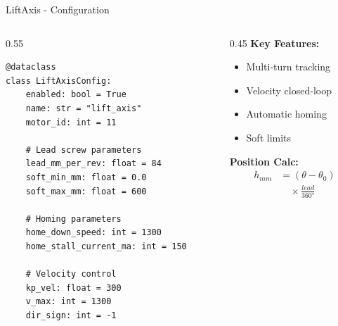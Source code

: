 \begin{frame}[fragile]{LiftAxis - Configuration}
\begin{columns}
\begin{column}{0.55\textwidth}
\begin{lstlisting}[basicstyle=\ttfamily\scriptsize]
@dataclass
class LiftAxisConfig:
    enabled: bool = True
    name: str = "lift_axis"
    motor_id: int = 11

    # Lead screw parameters
    lead_mm_per_rev: float = 84
    soft_min_mm: float = 0.0
    soft_max_mm: float = 600

    # Homing parameters
    home_down_speed: int = 1300
    home_stall_current_ma: int = 150

    # Velocity control
    kp_vel: float = 300
    v_max: int = 1300
    dir_sign: int = -1
\end{lstlisting}
\end{column}
\begin{column}{0.45\textwidth}
    \textbf{Key Features:}
    \begin{itemize}
        \item Multi-turn tracking
        \item Velocity closed-loop
        \item Automatic homing
        \item Soft limits
    \end{itemize}

    \vspace{0.3cm}

    \textbf{Position Calc:}
    \begin{align*}
        h_{mm} &= (\theta - \theta_0) \\
               &\quad \times \frac{lead}{360°}
    \end{align*}
\end{column}
\end{columns}
\end{frame}

